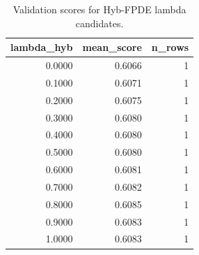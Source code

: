 \begin{table}[t]
\caption{Validation scores for Hyb-FPDE lambda candidates.}
\label{tab:lambda_distribution_computed}
\centering
\begin{tabular}{rrr}
\toprule
lambda\_hyb & mean\_score & n\_rows \\
\midrule
0.0000 & 0.6066 & 1 \\
0.1000 & 0.6071 & 1 \\
0.2000 & 0.6075 & 1 \\
0.3000 & 0.6080 & 1 \\
0.4000 & 0.6080 & 1 \\
0.5000 & 0.6080 & 1 \\
0.6000 & 0.6081 & 1 \\
0.7000 & 0.6082 & 1 \\
0.8000 & 0.6085 & 1 \\
0.9000 & 0.6083 & 1 \\
1.0000 & 0.6083 & 1 \\
\bottomrule
\end{tabular}

\end{table}
